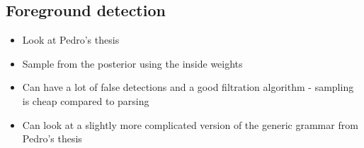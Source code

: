 \documentclass{book}
\begin{document}
\subsection{Foreground detection}
\label{sec-7_27_15}


\begin{itemize}
\item Look at Pedro's thesis
\item Sample from the posterior using the inside weights
\item Can have a lot of false detections and a good filtration
   algorithm - sampling is cheap compared to parsing
\item Can look at a slightly more complicated version of the generic grammar from Pedro's thesis
\end{itemize}
\end{document}
